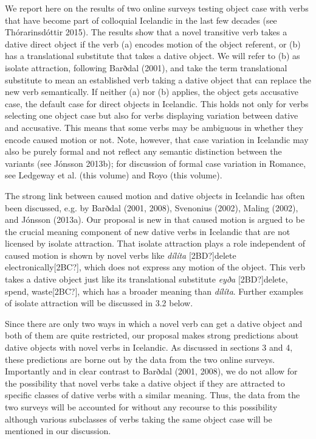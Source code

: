 \begin{styleStandard}
We report here on the results of two online surveys testing object case with verbs that have become part of colloquial Icelandic in the last few decades (see Thórarinsdóttir 2015). The results show that a novel transitive verb takes a dative direct object if the verb (a) encodes motion of the object referent, or (b) has a translational substitute that takes a dative object. We will refer to (b) as isolate attraction, following Barðdal (2001), and take the term translational substitute to mean an established verb taking a dative object that can replace the new verb semantically. If neither (a) nor (b) applies, the object gets accusative case, the default case for direct objects in Icelandic. This holds not only for verbs selecting one object case but also for verbs displaying variation between dative and accusative. This means that some verbs may be ambiguous in whether they encode caused motion or not. Note, however, that case variation in Icelandic may also be purely formal and not reflect any semantic distinction between the variants (see Jónsson 2013b); for discussion of formal case variation in Romance, see Ledgeway et al. (this volume) and Royo (this volume).
\end{styleStandard}

\begin{styleStandard}
The strong link between caused motion and dative objects in Icelandic has often been discussed, e.g. by Barðdal (2001, 2008), Svenonius (2002), Maling (2002), and Jónsson (2013a). Our proposal is new in that caused motion is argued to be the crucial meaning component of new dative verbs in Icelandic that are not licensed by isolate attraction. That isolate attraction plays a role independent of caused motion is shown by novel verbs like \textit{dílíta} [2BD?]delete electronically[2BC?], which does not express any motion of the object. This verb takes a dative object just like its translational substitute \textit{eyða} [2BD?]delete, spend, waste[2BC?], which has a broader meaning than \textit{dílíta}. Further examples of isolate attraction will be discussed in 3.2 below.
\end{styleStandard}

\begin{styleStandard}
Since there are only two ways in which a novel verb can get a dative object and both of them are quite restricted, our proposal makes strong predictions about dative objects with novel verbs in Icelandic. As discussed in sections 3 and 4, these predictions are borne out by the data from the two online surveys. Importantly and in clear contrast to Barðdal (2001, 2008), we do not allow for the possibility that novel verbs take a dative object if they are attracted to specific classes of dative verbs with a similar meaning. Thus, the data from the two surveys will be accounted for without any recourse to this possibility although various subclasses of verbs taking the same object case will be mentioned in our discussion.
\end{styleStandard}

